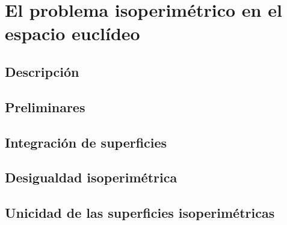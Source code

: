 \documentclass[ oneside,openany,titlepage,numbers=noenddot,headinclude,%
                footinclude=true,cleardoublepage=empty,abstractoff, %
                BCOR=5mm,paper=a4,fontsize=11pt,%
                spanish,american%
                ]{scrreprt}
\begin{document}
\frenchspacing
\raggedbottom
{} %
\pagestyle{plain}
%


\cleardoublepage
\cleardoublepage
\cleardoublepage
\pagestyle{scrheadings}
\cleardoublepage
\cleardoublepage{}
\cleardoublepage

\part{El problema isoperimétrico en el espacio euclídeo}

\chapter{Descripción}




\chapter{Preliminares}


\chapter{Integración de superficies}


\chapter{Desigualdad isoperimétrica}


\chapter{Unicidad de las superficies isoperimétricas}

\end{document}
